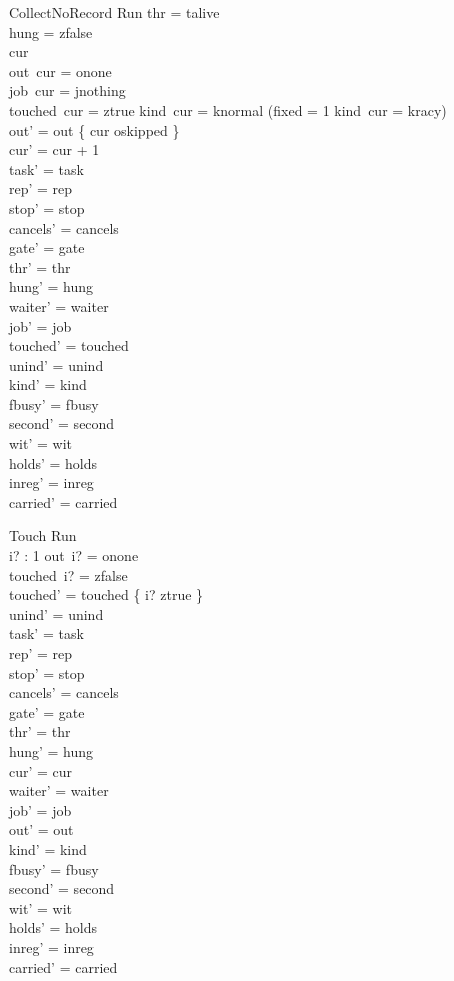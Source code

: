 \documentclass[a4paper,10pt,fleqn]{article}
\begin{document}
\begin{schema}{CollectNoRecord}
\Delta Run
\where
thr = talive \\
hung = zfalse \\
cur   \\
out~cur = onone \\
job~cur = jnothing \\
touched~cur = ztrue \lor kind~cur = knormal \lor
  (fixed = 1 \land kind~cur = kracy) \\
out' = out \oplus \{ cur \mapsto oskipped \} \\
cur' = cur + 1 \\
task' = task \\
rep' = rep \\
stop' = stop \\
cancels' = cancels \\
gate' = gate \\
thr' = thr \\
hung' = hung \\
waiter' = waiter \\
job' = job \\
touched' = touched \\
unind' = unind \\
kind' = kind \\
fbusy' = fbusy \\
second' = second \\
wit' = wit \\
holds' = holds \\
inreg' = inreg \\
carried' = carried
\end{schema}

\begin{schema}{Touch}
\Delta Run \\ i? : 1 
\where
out~i? = onone \\
touched~i? = zfalse \\
touched' = touched \oplus \{ i? \mapsto ztrue \} \\
unind' = unind \\
task' = task \\
rep' = rep \\
stop' = stop \\
cancels' = cancels \\
gate' = gate \\
thr' = thr \\
hung' = hung \\
cur' = cur \\
waiter' = waiter \\
job' = job \\
out' = out \\
kind' = kind \\
fbusy' = fbusy \\
second' = second \\
wit' = wit \\
holds' = holds \\
inreg' = inreg \\
carried' = carried
\end{schema}
\end{document}
